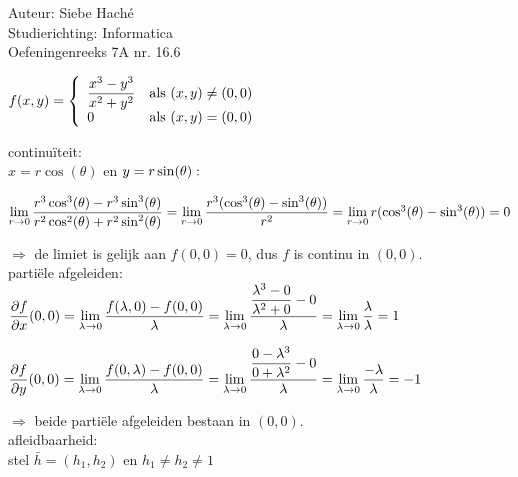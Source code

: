 \documentclass[a4paper]{article}
\begin{document}
\noindent \large Auteur: Siebe Haché \\
\noindent \large Studierichting: Informatica \\
\noindent \large Oefeningenreeks 7A nr. 16.6\\

\medskip
\normalsize

$f(x,y) = 
\left\{
\begin{array}{ll}
\dfrac{x^3 - y^3}{x^2 + y^2} & \text{als } (x,y) \neq (0,0) \\
0 & \text{als } (x,y) = (0,0)
\end{array}
\right. \\$

continuïteit: \\

$x = r \cos(\theta)$ en $y = r \sin(\theta): \\$

$\lim\limits_{r \to 0} \dfrac{r^3 \cos^3(\theta) - r^3 \sin^3(\theta)}{r^2 \cos^2(\theta) + r^2 \sin^2(\theta)} = \lim\limits_{r \to 0} \dfrac{r^3 (\cos^3(\theta) - \sin^3(\theta))}{r^2} = \lim\limits_{r \to 0} r (\cos^3(\theta) - \sin^3(\theta)) = 0 \\$

$\Rightarrow$ de limiet is gelijk aan $f(0,0) = 0$, dus $f$ is continu in $(0,0)$. \\

partiële afgeleiden: \\

$\dfrac{\partial f}{\partial x}(0,0) = \lim\limits_{\lambda \to 0} \dfrac{f(\lambda, 0) - f(0,0)}{\lambda} = \lim\limits_{\lambda \to 0} \dfrac{\dfrac{\lambda^3 - 0}{\lambda^2 + 0} - 0}{\lambda} = \lim\limits_{\lambda \to 0} \dfrac{\lambda}{\lambda} = 1 \\$

$\dfrac{\partial f}{\partial y}(0,0) = \lim\limits_{\lambda \to 0} \dfrac{f(0, \lambda) - f(0,0)}{\lambda} = \lim\limits_{\lambda \to 0} \dfrac{\dfrac{0 - \lambda^3}{0 + \lambda^2} - 0}{\lambda} = \lim\limits_{\lambda \to 0} \dfrac{-\lambda}{\lambda} = -1 \\$

$\Rightarrow$ beide partiële afgeleiden bestaan in $(0,0)$. \\

afleidbaarheid: \\

stel $\bar h = (h_1, h_2)$ en $h_1 \neq h_2 \neq1$\\
\end{document}
